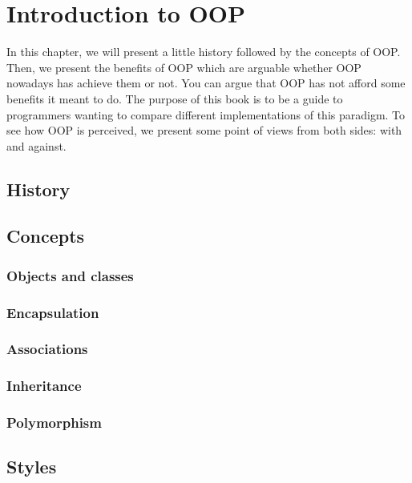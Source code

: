 \documentclass[12pt]{book}
\begin{document}
		\chapter{Introduction to OOP}
\fi

\begin{introduction}
	In this chapter, we will present a little history followed by the concepts of OOP.
	Then, we present the benefits of OOP which are arguable whether OOP nowadays has achieve them or not. 
	You can argue that OOP has not afford some benefits it meant to do. 
	The purpose of this book is to be a guide to programmers wanting to compare different implementations of this paradigm. 
	To see how OOP is perceived, we present some point of views from both sides: with and against.
\end{introduction}

\section{History}

\section{Concepts}

\subsection{Objects and classes}

\subsection{Encapsulation}

\subsection{Associations}

\subsection{Inheritance}

\subsection{Polymorphism}


\section{Styles}
\end{document}
